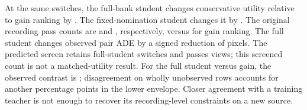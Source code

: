 At the same \StructuredSwitches{} switches, the full-bank
student changes conservative utility relative to gain
ranking by \StudentVsGain. The fixed-nomination student
changes it by \NomineeVsGain. The original recording
pass counts are \StudentPass{} and \NomineePass, respectively,
versus \GainPass{} for gain ranking. The full student changes
observed pair ADE by a signed reduction of \StudentPair{} pixels.
The predicted screen retains \ScreenSwitches{} full-student
switches and passes \ScreenPass{} views; this screened count
is not a matched-utility result. For the full student versus
gain, the observed contrast is \StudentKnown; disagreement
on wholly unobserved rows accounts for another
\StudentMissing{} percentage points in the lower envelope.
Closer agreement with a training teacher is not enough to
recover its recording-level constraints on a new source.
